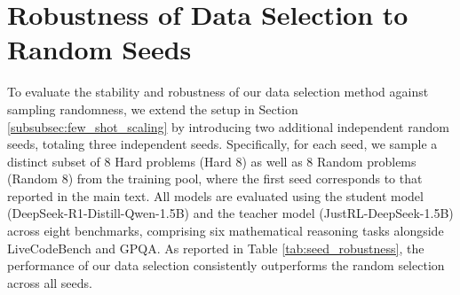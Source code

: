 \section{Robustness of Data Selection to Random Seeds} \label{app:random_seed}

To evaluate the stability and robustness of our data selection method against sampling randomness, we extend the setup in Section \ref{subsubsec:few_shot_scaling} by introducing two additional independent random seeds, totaling three independent seeds. Specifically, for each seed, we sample a distinct subset of 8 Hard problems (Hard 8) as well as 8 Random problems (Random 8) from the training pool, where the first seed corresponds to that reported in the main text. All models are evaluated using the student model (DeepSeek-R1-Distill-Qwen-1.5B) and the teacher model (JustRL-DeepSeek-1.5B) across eight benchmarks, comprising six mathematical reasoning tasks alongside LiveCodeBench and GPQA. As reported in Table \ref{tab:seed_robustness}, the performance of our data selection consistently outperforms the random selection across all seeds.



\begin{table}[htbp]
\centering
\caption{\textbf{Robustness of Data Selection Across Different Random Seeds.} We report benchmark accuracies across eight evaluation benchmarks alongside their average (Avg) for different data selection under three independent random sampling seeds. Group 1 represents the default seed used in the main text, while Group 2 and Group 3 represent additional independent random seeds.}
\label{tab:seed_robustness}
\small
{}
\end{table}

